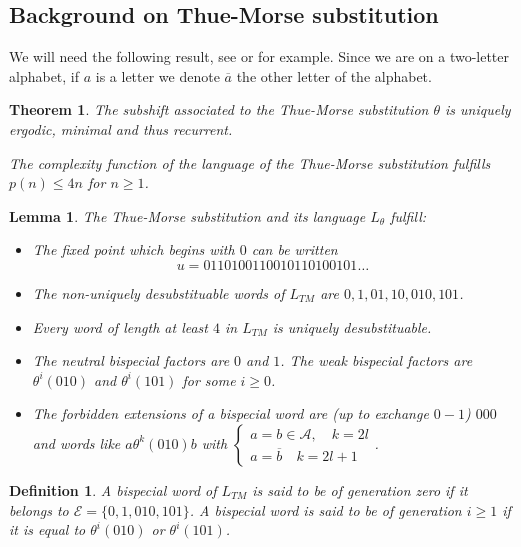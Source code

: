 \documentclass[11 pt]{article}
\newtheorem{theorem}[proposition]{Theorem}
\newtheorem{lemma}[proposition]{Lemma}
\newtheorem{definition}[proposition]{Definition}
\theoremstyle{definition}
\begin{document}
 \subsection{Background on Thue-Morse substitution}
We will need the following result, see \cite{Pyth.02} or \cite{Durand-Perrin-22} for example. Since we are on a two-letter alphabet, if $a$ is a letter we denote $\overline{a}$ the other letter of the alphabet.

 \begin{theorem}
The subshift associated to the Thue-Morse substitution $\theta$ is uniquely ergodic, minimal and thus recurrent. 

The complexity function of the language of the Thue-Morse substitution fulfills $p(n)\leq 4n$ for $n\geq 1$. 
\end{theorem}


 \begin{lemma}\label{lem-cass}
The Thue-Morse substitution and its language $L_{\theta}$ fulfill:
\begin{itemize}
\item The fixed point which begins with $0$ can be written $$u=0110100110010110100101\dots$$

\item The non-uniquely desubstituable words of $L_{TM}$ are $0,1,01,10,010,101$.
\item Every word of length at least $4$ in $L_{TM}$ is uniquely desubstituable.
\item The neutral bispecial factors are $0$ and $1$. The weak bispecial factors are $\theta^i(010)$ and $\theta^i(101)$ for some $i\geq 0$.
\item The forbidden extensions of a bispecial word are (up to exchange $0-1$) $000$ and words like $a\theta^k(010)b$ with $\begin{cases}a=b\in \mathcal{A}, \quad k=2l\\ a=\overline{b}\quad k=2l+1\end{cases}$.


\end{itemize}
\end{lemma}




\begin{definition}\label{def-generation}
A bispecial word of $L_{TM}$ is said to be of generation zero if it belongs to $\mathcal E=\{0, 1, 010, 101\}$.
A bispecial word is said to be of generation $i\geq 1$ if it is equal to $\theta^i(010)$ or $\theta^i(101)$. %
\end{definition}
\end{document}
